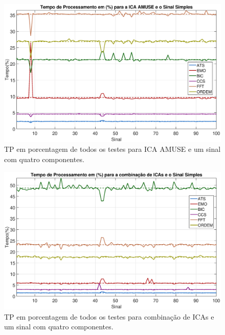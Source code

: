 \documentclass[a4paper,12pt]{monografia}
\theoremstyle{plain}
\theoremstyle{definition}
\theoremstyle{remark}
\begin{document}
\begin{figure}[!htb]
    \begin{center}
    \advance\leftskip -1.5cm
    \includegraphics[scale=0.45]{imagens/ImagensParaOAnexo/TPPEICAAMUSeSinalSimples.eps}
    \caption{TP em porcentagem de todos os testes para ICA AMUSE e um sinal com quatro componentes.}
    \label{fig:TPAMSinalsimples}    
    \end{center}
\end{figure}

\begin{figure}[!htb]
    \begin{center}
    \advance\leftskip -1.5cm
    \includegraphics[scale=0.45]{imagens/ImagensParaOAnexo/TPPECombinacaoICASinalSimples.eps}
    \caption{TP em porcentagem de todos os testes para combinação de ICAs  e um sinal com quatro componentes.}
    \label{fig:TPCISinalsimples}    
    \end{center}
\end{figure}
\end{document}
